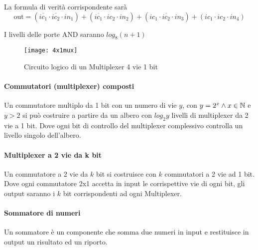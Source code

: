 La formula di verità corrispondente sarà
\[ \text{out} = (\overbar{ic_1} \cdot \overbar{ic_2} \cdot in_1) + (\overbar{ic_1} \cdot ic_2 \cdot in_2) + (ic_1 \cdot \overbar{ic_2} \cdot in_3) + (ic_1\cdot ic_2 \cdot in_4)  \]

I livelli delle porte AND saranno $ log_8(n+1) $

\begin{figure}[H]
	\centering
	\texttt{[image: 4x1mux]}
	\caption{Circuito logico di un Multiplexer 4 vie 1 bit}
\end{figure}

\paragraph{Commutatori (multiplexer) composti}
Un commutatore multiplo da 1 bit con un numero di vie $ y $, con $ y = 2^x \land x \in \mathbb{N} $ e $ y > 2 $ si può costruire a partire da un albero con $ log_2y $ livelli di multiplexer da 2 vie a 1 bit. Dove ogni bit di controllo del multiplexer complessivo controlla un livello singolo dell'albero.


\paragraph{Multiplexer a 2 vie da k bit}

Un commutatore a 2 vie da $ k $ bit si costruisce con $ k $ commutatori a 2 vie ad 1 bit. Dove ogni commutatore 2x1 accetta in input le corrispettive vie di ogni bit, gli output saranno i $ k $ bit corrispondenti ad ogni Multiplexer.



\paragraph{Sommatore di numeri}
Un sommatore è un componente che somma due numeri in input e restituisce in output un risultato ed un riporto.

